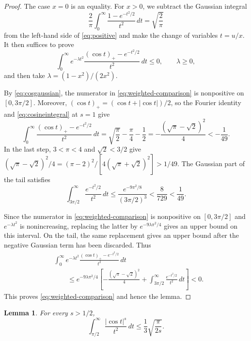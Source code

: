 \documentclass[a4paper,twoside,11pt,reqno]{amsart}
\newtheorem{lemma}{Lemma}
\theoremstyle{definition}
\theoremstyle{remark}
\newcommand{\1}{\mathbbm{1}}
\begin{document}
\begin{proof}
The case $x=0$ is an equality. For $x>0$, we subtract the Gaussian integral
\[
 \frac2\pi\int_0^\infty\frac{1-e^{-t^2/2}}{t^2}\,dt=\sqrt{\frac2\pi}
\]
from the left-hand side of \eqref{eq:positive} and make the change of variables $t=u/x$. It then suffices to prove
\begin{equation}\label{eq:weighted-comparison}
 \int_0^\infty e^{-\lambda t^2}
 \frac{(\cos t)_+-e^{-t^2/2}}{t^2}\,dt\le0,
 \qquad \lambda\ge0,
\end{equation}
and then take $\lambda=(1-x^2)/(2x^2)$. 

By \eqref{eq:cosgaussian}, the numerator in \eqref{eq:weighted-comparison} is nonpositive on $[0,3\pi/2]$. Moreover, $(\cos t)_+=(\cos t+|\cos t|)/2$, so the Fourier identity and \eqref{eq:cosineintegral} at $s=1$ give
\[
 \int_0^\infty\frac{(\cos t)_+-e^{-t^2/2}}{t^2}\,dt
 =\sqrt{\frac\pi2}-\frac\pi4-\frac12
 =-\frac{(\sqrt\pi-\sqrt2)^2}{4}<-\frac1{49}.
\]
In the last step, $3<\pi<4$ and $\sqrt2<3/2$ give
$(\sqrt\pi-\sqrt2)^2/4=(\pi-2)^2/[4(\sqrt\pi+\sqrt2)^2]>1/49$.
The Gaussian part of the tail satisfies
\[
 \int_{3\pi/2}^\infty\frac{e^{-t^2/2}}{t^2}\,dt
 \le\frac{e^{-9\pi^2/8}}{(3\pi/2)^3}<\frac8{729}<\frac1{49}.
\]

Since the numerator in \eqref{eq:weighted-comparison} is nonpositive on $[0,3\pi/2]$ and $e^{-\lambda t^2}$ is nonincreasing, replacing the latter by $e^{-9\lambda\pi^2/4}$ gives an upper bound on this interval. On the tail, the same replacement gives an upper bound after the negative Gaussian term has been discarded. Thus
\begin{align*}
 &\int_0^\infty e^{-\lambda t^2}
       \frac{(\cos t)_+-e^{-t^2/2}}{t^2}\,dt\\
 &\qquad\le e^{-9\lambda\pi^2/4}
 \left[-\frac{(\sqrt\pi-\sqrt2)^2}{4}
       +\int_{3\pi/2}^\infty\frac{e^{-t^2/2}}{t^2}\,dt\right]<0.
\end{align*}
This proves \eqref{eq:weighted-comparison} and hence the lemma.
\end{proof}

\begin{lemma}\label{lem:cosinetail}
For every $s>1/2$,
\begin{equation}\label{eq:cosinetail}
 \int_{\pi/2}^\infty\frac{|\cos t|^s}{t^2}\,dt
 \le\frac13\sqrt{\frac\pi{2s}}.
\end{equation}
\end{lemma}
\end{document}
